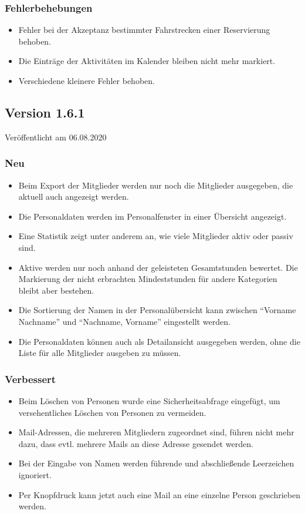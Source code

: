 \subsubsection{Fehlerbehebungen}
\begin{itemize}
  \item
  Fehler bei der Akzeptanz bestimmter Fahrstrecken einer Reservierung behoben.
  \item
  Die Einträge der Aktivitäten im Kalender bleiben nicht mehr markiert.
  \item
  Verschiedene kleinere Fehler behoben.
\end{itemize}


\subsection{Version 1.6.1}
\label{version:1:6:1}
Veröffentlicht am 06.08.2020
\subsubsection{Neu}
\begin{itemize}
  \item
  Beim Export der Mitglieder werden nur noch die Mitglieder ausgegeben, die aktuell auch angezeigt werden.
  \item
  Die Personaldaten werden im Personalfenster in einer Übersicht angezeigt.
  \item
  Eine Statistik zeigt unter anderem an, wie viele Mitglieder aktiv oder passiv sind.
  \item
  Aktive werden nur noch anhand der geleisteten Gesamtstunden bewertet.
  Die Markierung der nicht erbrachten Mindeststunden für andere Kategorien bleibt aber bestehen.
  \item
  Die Sortierung der Namen in der Personalübersicht kann zwischen "`Vorname Nachname"' und "`Nachname, Vorname"' eingestellt werden.
  \item
  Die Personaldaten können auch als Detailansicht ausgegeben werden, ohne die Liste für alle Mitglieder ausgeben zu müssen.
\end{itemize}

\subsubsection{Verbessert}
\begin{itemize}
  \item
  Beim Löschen von Personen wurde eine Sicherheitsabfrage eingefügt, um versehentliches Löschen von Personen zu vermeiden.
  \item
  Mail-Adressen, die mehreren Mitgliedern zugeordnet sind, führen nicht mehr dazu, dass evtl. mehrere Mails an diese Adresse gesendet werden.
  \item
  Bei der Eingabe von Namen werden führende und abschließende Leerzeichen ignoriert.
  \item
  Per Knopfdruck kann jetzt auch eine Mail an eine einzelne Person geschrieben werden.
\end{itemize}

